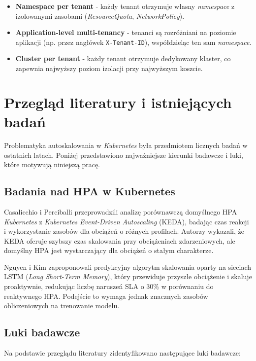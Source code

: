 \begin{itemize}
  \item \textbf{Namespace per tenant} - każdy tenant otrzymuje własny \textit{namespace} z izolowanymi zasobami (\textit{ResourceQuota}, \textit{NetworkPolicy}).
  \item \textbf{Application-level multi-tenancy} - tenanci są rozróżniani na poziomie aplikacji (np. przez nagłówek \texttt{X-Tenant-ID}), współdzieląc ten sam \textit{namespace}.
  \item \textbf{Cluster per tenant} - każdy tenant otrzymuje dedykowany klaster, co zapewnia najwyższy poziom izolacji przy najwyższym koszcie.
\end{itemize}

\section{Przegląd literatury i istniejących badań}

Problematyka autoskalowania w \textit{Kubernetes} była przedmiotem licznych badań w ostatnich latach. Poniżej przedstawiono najważniejsze kierunki badawcze i luki, które motywują niniejszą pracę.

\subsection{Badania nad HPA w Kubernetes}

Casalicchio i Perciballi \cite{huawei2021} przeprowadzili analizę porównawczą domyślnego HPA \textit{Kubernetes} z \textit{Kubernetes Event-Driven Autoscaling} (KEDA), badając czas reakcji i wykorzystanie zasobów dla obciążeń o różnych profilach. Autorzy wykazali, że KEDA oferuje szybszy czas skalowania przy obciążeniach zdarzeniowych, ale domyślny HPA jest wystarczający dla obciążeń o stałym charakterze.

Nguyen i Kim \cite{nguyen2020} zaproponowali predykcyjny algorytm skalowania oparty na sieciach LSTM (\textit{Long Short-Term Memory}), który przewiduje przyszłe obciążenie i skaluje proaktywnie, redukując liczbę naruszeń SLA o 30\% w porównaniu do reaktywnego HPA. Podejście to wymaga jednak znacznych zasobów obliczeniowych na trenowanie modelu.

\subsection{Luki badawcze}

Na podstawie przeglądu literatury zidentyfikowano następujące luki badawcze:

